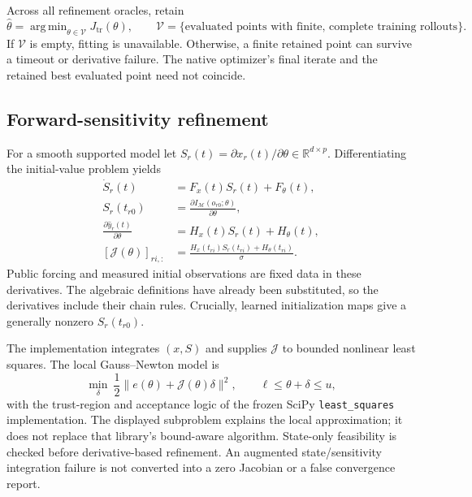 \documentclass[11pt]{article}
\newcommand{\R}{\mathbb{R}}
\newcommand{\M}{\mathcal{M}}
\DeclareMathOperator*{\argmin}{arg\,min}
\begin{document}
Across all refinement oracles, retain
\begin{equation}
 \widehat\theta=\argmin_{\theta\in\mathcal V}J_{\mathrm{tr}}(\theta),\qquad
 \mathcal V=\{\text{evaluated points with finite, complete training rollouts}\}.
 \label{eq:retained-fit}
\end{equation}
If $\mathcal V$ is empty, fitting is unavailable. Otherwise, a finite retained
point can survive a timeout or derivative failure. The native optimizer's final
iterate and the retained best evaluated point need not coincide.

\subsection{Forward-sensitivity refinement}
For a smooth supported model let
$S_r(t)=\partial x_r(t)/\partial\theta\in\R^{d\times p}$. Differentiating the
initial-value problem yields
\begin{subequations}\label{eq:sensitivities}
\begin{align}
 \dot S_r(t)&=F_x(t)S_r(t)+F_\theta(t),\\
 S_r(t_{r0})&=\frac{\partial I_{\M}(o_{r0};\theta)}{\partial\theta},\\
 \frac{\partial\widehat y_r(t)}{\partial\theta}
   &=H_x(t)S_r(t)+H_\theta(t),\\
 [\mathcal J(\theta)]_{ri,:}
   &=\frac{H_x(t_{ri})S_r(t_{ri})+H_\theta(t_{ri})}{\sigma}.
\end{align}
\end{subequations}
Public forcing and measured initial observations are fixed data in these
derivatives. The algebraic definitions have already been substituted, so the
derivatives include their chain rules. Crucially, learned initialization maps
give a generally nonzero $S_r(t_{r0})$.

The implementation integrates $(x,S)$ and supplies $\mathcal J$ to bounded
nonlinear least squares. The local Gauss--Newton model is
\begin{equation}
 \min_{\delta}\ \frac12\|e(\theta)+\mathcal J(\theta)\delta\|^2,
 \qquad \ell\leq\theta+\delta\leq u,
\end{equation}
with the trust-region and acceptance logic of the frozen SciPy
\texttt{least\_squares} implementation. The displayed subproblem explains the
local approximation; it does not replace that library's bound-aware algorithm.
State-only feasibility is checked before derivative-based refinement. An
augmented state/sensitivity integration failure is not converted into a zero
Jacobian or a false convergence report.
\end{document}
